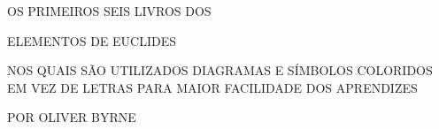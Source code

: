 \documentclass[booklanguage=brazilian]{byrnebook}
\begin{document}
\newcommand{\triangleABC}{\ensuremath{\triangle ABC}}
\newcommand{\triangleABD}{\ensuremath{\triangle ABD}}
\newcommand{\triangleABG}{\ensuremath{\triangle ABG}}
\newcommand{\triangleADE}{\ensuremath{\triangle ADE}}
\newcommand{\triangleAEF}{\ensuremath{\triangle AEF}}
\newcommand{\triangleBDE}{\ensuremath{\triangle BDE}}
\newcommand{\triangleCDE}{\ensuremath{\triangle CDE}}
\newcommand{\triangleDEF}{\ensuremath{\triangle DEF}}
\newcommand{\triangleFEB}{\ensuremath{\triangle FEB}}
\newcommand{\triangleKGH}{\ensuremath{\triangle KGH}}

\thispagestyle{empty}

\begin{center}

\Large \uppercase{Os primeiros seis livros dos}

\LARGE \uppercase{Elementos de Euclides}

\baselineskip

\normalsize \uppercase{nos quais são utilizados diagramas e símbolos coloridos em vez de letras para maior facilidade dos aprendizes}

\baselineskip

\Large \uppercase{Por Oliver Byrne}



\end{center}
\end{document}
